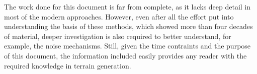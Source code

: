 \documentclass{acmtog}
\begin{document}
The work done for this document is far from complete, as it lacks deep detail in most of the modern approaches. However, even after all the effort put into understanding the basis of these methods, which showed more than four decades of material, deeper investigation is also required to better understand, for example, the noise mechanisms. Still, given the time contraints and the purpose of this document, the information included easily provides any reader with the required knowledge in terrain generation.



\end{document}
